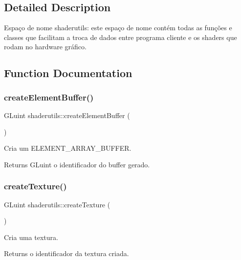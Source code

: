 \subsection{Detailed Description}
Espaço de nome shaderutils\+: este espaço de nome contém todas as funções e classes que facilitam a troca de dados entre programa cliente e os shaders que rodam no hardware gráfico. 

\subsection{Function Documentation}
\mbox{\label{namespaceshaderutils_a952f4510fcf359caa18418388d5a3a6b}} 
\subsubsection{\texorpdfstring{create\+Element\+Buffer()}{createElementBuffer()}}
{\footnotesize\ttfamily G\+Luint shaderutils\+::create\+Element\+Buffer (\begin{DoxyParamCaption}{ }\end{DoxyParamCaption})}

Cria um E\+L\+E\+M\+E\+N\+T\+\_\+\+A\+R\+R\+A\+Y\+\_\+\+B\+U\+F\+F\+ER. \begin{DoxyReturn}{Returns}
G\+Luint o identificador do buffer gerado. 
\end{DoxyReturn}
\mbox{\label{namespaceshaderutils_aa80123a5faeea08f96535d0072c9fae6}} 
\subsubsection{\texorpdfstring{create\+Texture()}{createTexture()}}
{\footnotesize\ttfamily G\+Luint shaderutils\+::create\+Texture (\begin{DoxyParamCaption}{ }\end{DoxyParamCaption})}

Cria uma textura. \begin{DoxyReturn}{Returns}
o identificador da textura criada. 
\end{DoxyReturn}
\mbox{\label{namespaceshaderutils_a3dd5a3672853d5682b4ed455ec14a8a8}} 
